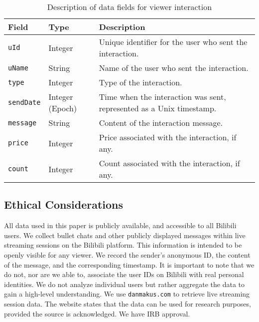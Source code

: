 \begin{table}[h!]
\centering \small
\begin{tabular}{|l|l|L{14em}|}
\hline
\textbf{Field}           & \textbf{Type}             & \textbf{Description}                                                             \\ \hline
\texttt{uId}             & Integer                   & Unique identifier for the user who sent the interaction.                             \\ \hline
\texttt{uName}           & String                    & Name of the user who sent the interaction.                                           \\ \hline
\texttt{type}            & Integer                   & Type of the interaction.                                                             \\ \hline
\texttt{sendDate}        & Integer (Epoch)           & Time when the interaction was sent, represented as a Unix timestamp.                 \\ \hline
\texttt{message}         & String                    & Content of the interaction message.                                                  \\ \hline
\texttt{price}           & Integer                   & Price associated with the interaction, if any.                                       \\ \hline
\texttt{count}           & Integer                   & Count associated with the interaction, if any.                                       \\ \hline
\end{tabular}
\caption{Description of data fields for viewer interaction}
\label{table:danmakus_description}
\end{table}


\subsection{Ethical Considerations}
\label{subsec:appendix_ethics}

All data used in this paper is publicly available, and accessible to all Bilibili users. We collect bullet chats and other publicly displayed messages within live streaming sessions on the Bilibili platform. This information is intended to be openly visible for any viewer. We record the sender's anonymous ID, the content of the message, and the corresponding timestamp.
% 
It is important to note that we do not, nor are we able to, associate the user IDs on Bilibili with real personal identities. We do not analyze individual users but rather aggregate the data to gain a high-level understanding.
% 
We use \texttt{danmakus.com} to retrieve live streaming session data. The website states that the data can be used for research purposes, provided the source is acknowledged. We have IRB approval.

